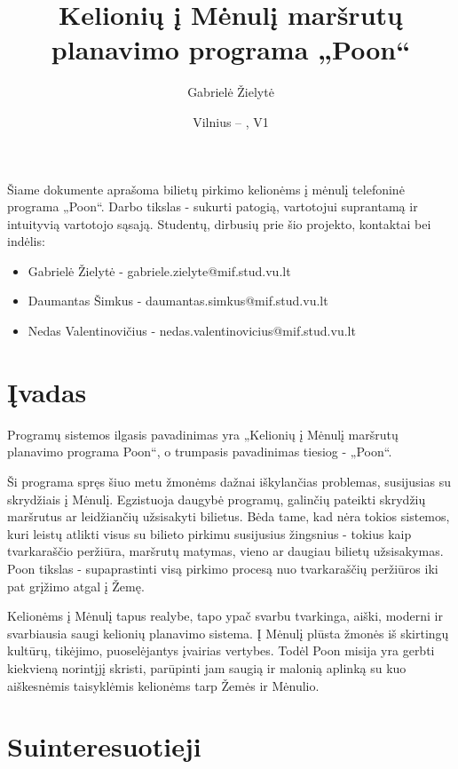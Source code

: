 \documentclass{VUMIFPSkursinis}
\title{Kelionių į Mėnulį maršrutų planavimo programa „Poon“}
\author{Gabrielė Žielytė}
\date{Vilnius – \the\year, V1}
\begin{document}
	
\maketitle

\thispagestyle{empty}
\tableofcontents


Šiame dokumente aprašoma bilietų pirkimo kelionėms į mėnulį telefoninė programa „Poon“. Darbo tikslas - sukurti patogią, vartotojui suprantamą ir intuityvią vartotojo sąsają.
Studentų, dirbusių prie šio projekto, kontaktai bei indėlis:
\begin{itemize}
\item Gabrielė Žielytė - gabriele.zielyte@mif.stud.vu.lt
\item Daumantas Šimkus - daumantas.simkus@mif.stud.vu.lt
\item Nedas Valentinovičius - nedas.valentinovicius@mif.stud.vu.lt
\end{itemize}
\thispagestyle{empty}

\cleardoublepage{}
\setcounter{page}{4}

\section{Įvadas}
Programų sistemos ilgasis pavadinimas yra „Kelionių į Mėnulį maršrutų planavimo programa Poon“, o trumpasis pavadinimas tiesiog - „Poon“.

Ši programa spręs šiuo metu žmonėms dažnai iškylančias problemas, susijusias su skrydžiais į Mėnulį. Egzistuoja daugybė programų, galinčių pateikti skrydžių maršrutus ar leidžiančių užsisakyti bilietus. Bėda tame, kad nėra tokios sistemos, kuri leistų atlikti visus su bilieto pirkimu susijusius žingsnius - tokius kaip tvarkaraščio peržiūra, maršrutų matymas, vieno ar daugiau bilietų užsisakymas. Poon tikslas - supaprastinti visą pirkimo procesą nuo tvarkaraščių peržiūros iki pat grįžimo atgal į Žemę.

Kelionėms į Mėnulį tapus realybe, tapo ypač svarbu tvarkinga, aiški, moderni ir svarbiausia saugi kelionių planavimo sistema. Į Mėnulį plūsta žmonės iš skirtingų kultūrų, tikėjimo, puoselėjantys įvairias vertybes. Todėl Poon misija yra gerbti kiekvieną norintįjį skristi, parūpinti jam saugią ir malonią aplinką su kuo aiškesnėmis taisyklėmis kelionėms tarp Žemės ir Mėnulio.



\section{Suinteresuotieji}
\end{document}
